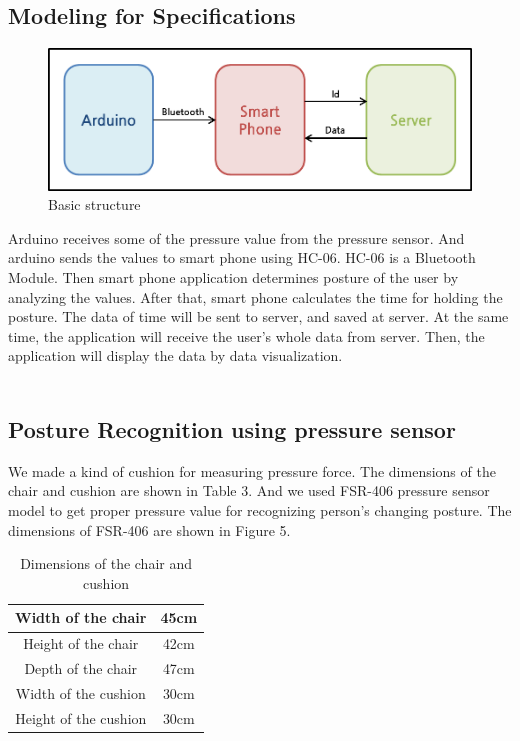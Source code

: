 \documentclass[conference]{IEEEtran}
\begin{document}
\subsection{Modeling for Specifications \\}


\begin{figure}[H]
\begin{center}
    \includegraphics[scale=0.55]{img_04.png}
    \caption{Basic structure} 
\end{center}
\end{figure}


 Arduino receives some of the pressure value from the pressure sensor. And arduino sends the values to smart phone using HC-06. HC-06 is a Bluetooth Module. Then smart phone application determines posture of the user by analyzing the values. After that, smart phone calculates the time for holding the posture. The data of time will be sent to server, and saved at server.
At the same time, the application will receive the user's whole data from server. Then, the application will display the data by data visualization.\\\\

\subsection{Posture Recognition using pressure sensor}
 We made a kind of cushion for measuring pressure force. The dimensions of the chair and cushion are shown in Table 3. And we used FSR-406 pressure sensor model to get proper pressure value for recognizing person's changing posture. The dimensions of FSR-406 are shown in Figure 5.\\
 
 \begin{table}[h]
{\renewcommand\arraystretch{1.25}
\caption{Dimensions of the chair and cushion}
\begin{tabular}{|c|cc}  \hline\hline
Width of the chair& \multicolumn{2}{p{5cm}|}{\raggedright 45cm} \\ \hline
Height of the chair& \multicolumn{2}{p{5cm}|}{\raggedright 42cm} \\ \hline
Depth of the chair& \multicolumn{2}{p{5cm}|}{\raggedright 47cm} \\ \hline
Width of the cushion& \multicolumn{2}{p{5cm}|}{\raggedright 30cm} \\ \hline
Height of the cushion& \multicolumn{2}{p{5cm}|}{\raggedright 30cm} \\ \hline \hline
\end{tabular}}
\end{table}
\end{document}

